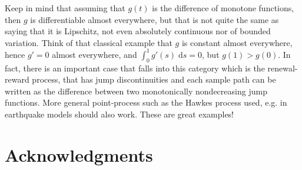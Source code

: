\documentclass[reqno,12pt]{amsart}
\theoremstyle{plain}%
\theoremstyle{definition}
\newcommand{\dontshow}[1]{}
\begin{document}
Keep in mind that assuming that $g(t)$ is the difference of monotone functions, then $g$ is differentiable almost everywhere, but that is not quite the same as saying that it is Lipschitz, not even absolutely continuous nor of bounded variation. Think of that classical example that $g$ is constant almost everywhere, hence $g' = 0$ almost everywhere, and $\int_0^1 g'(s) \;\mathrm{d}s = 0$, but $g(1) > g(0)$. In fact, there is an important case that falls into this category which is the renewal-reward process, that has jump discontinuities and each sample path can be written as the difference between two monotonically nondecreasing jump functions. More general point-process such as the Hawkes process used, e.g. in earthquake models should also work. These are great examples!

\dontshow{For the power function $t \mapsto t^\theta$, for $t \geq 0$, with $0<\theta\leq 1$, we have, for $t > s \geq 0$,
\begin{align*}
    \frac{|t^{\theta} - s^{\theta}|}{|t - s|^\theta} = \frac{\left|1 - \left(\frac{s}{t}\right)^\theta\right|}{\left|1 - \left(\frac{s}{t}\right)\right|^\theta} \leq \frac{\left|1 - \left(\frac{s}{t}\right)\right|}{\left|1 - \left(\frac{s}{t}\right)\right|} = 1,
\end{align*}
where we used that $(s/t)^\theta \geq (s/t)$, since $0 \leq s/t < 1$ and $0 < \theta \leq 1$, and, similarly, that $(1 - s/t)^\theta \geq (1 - s/t)$. This shows that $t \mapsto t^\theta$ is H\"older continuous with H\"older exponent $\theta$ and H\"older constant $1$.
}


\section*{Acknowledgments}


\begin{thebibliography}{25}


\end{thebibliography}
\end{document}
